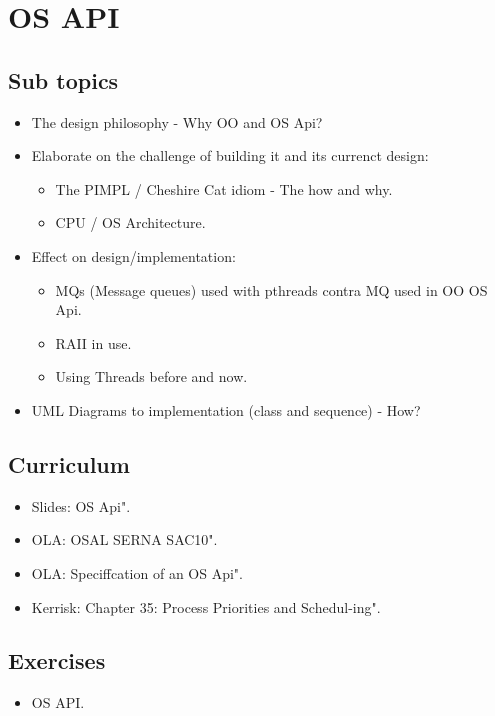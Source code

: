 \section{OS API}

\subsection{Sub topics}

\begin{itemize}
	\item The design philosophy - Why OO and OS Api?
	\item Elaborate on the challenge of building it and its currenct design:
	\begin{itemize}
		\item The PIMPL / Cheshire Cat idiom - The how and why.
		\item CPU / OS Architecture.
	\end{itemize}
	\item Effect on design/implementation:
	\begin{itemize}
		\item MQs (Message queues) used with pthreads contra MQ used in OO OS Api.
		\item RAII in use.
		\item Using Threads before and now.
	\end{itemize}
	\item UML Diagrams to implementation (class and sequence) - How?
\end{itemize}

\subsection{Curriculum}

\begin{itemize}
	\item Slides: OS Api".
	\item OLA: OSAL SERNA SAC10".
	\item OLA: Speciffcation of an OS Api".
 	\item Kerrisk: Chapter 35: Process Priorities and Schedul-ing".
\end{itemize}

\subsection{Exercises}

\begin{itemize}
	\item OS API.
\end{itemize}